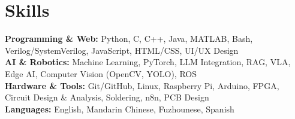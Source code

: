 \documentclass[11pt, letterpaper]{article}
\begin{document}
\vspace{2pt}

\section{Skills}

\noindent
\textbf{Programming \& Web:} Python, C, C++, Java, MATLAB, Bash, Verilog/SystemVerilog, JavaScript, HTML/CSS, UI/UX Design \\[1pt]
\textbf{AI \& Robotics:} Machine Learning, PyTorch, LLM Integration, RAG, VLA, Edge AI, Computer Vision (OpenCV, YOLO), ROS \\[1pt]
\textbf{Hardware \& Tools:} Git/GitHub, Linux, Raspberry Pi, Arduino, FPGA, Circuit Design \& Analysis, Soldering, n8n, PCB Design \\[1pt]
\textbf{Languages:} English, Mandarin Chinese, Fuzhounese, Spanish
\end{document}
